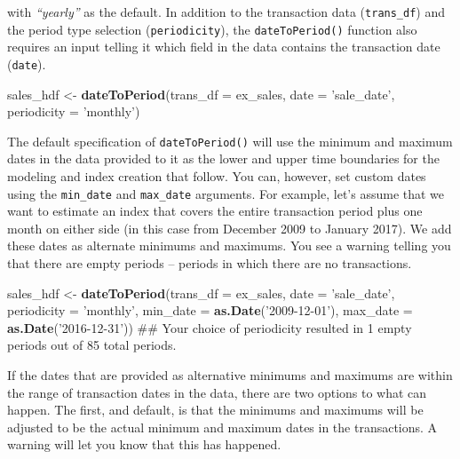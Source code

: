 \documentclass[]{article}
\newenvironment{Shaded}{\begin{snugshade}}{\end{snugshade}}
\newcommand{\DataTypeTok}[1]{\textcolor[rgb]{0.13,0.29,0.53}{#1}}
\newcommand{\KeywordTok}[1]{\textcolor[rgb]{0.13,0.29,0.53}{\textbf{#1}}}
\newcommand{\NormalTok}[1]{#1}
\newcommand{\StringTok}[1]{\textcolor[rgb]{0.31,0.60,0.02}{#1}}
\begin{document}
with \emph{``yearly''} as the default. In addition to the transaction
data (\texttt{trans\_df}) and the period type selection
(\texttt{periodicity}), the \texttt{dateToPeriod()} function also
requires an input telling it which field in the data contains the
transaction date (\texttt{date}).

\begin{Shaded}
\begin{Highlighting}[]
\NormalTok{  sales_hdf <-}\StringTok{ }\KeywordTok{dateToPeriod}\NormalTok{(}\DataTypeTok{trans_df =}\NormalTok{ ex_sales,}
                            \DataTypeTok{date =} \StringTok{'sale_date'}\NormalTok{,}
                            \DataTypeTok{periodicity =} \StringTok{'monthly'}\NormalTok{)}
\end{Highlighting}
\end{Shaded}

The default specification of \texttt{dateToPeriod()} will use the
minimum and maximum dates in the data provided to it as the lower and
upper time boundaries for the modeling and index creation that follow.
You can, however, set custom dates using the \texttt{min\_date} and
\texttt{max\_date} arguments. For example, let's assume that we want to
estimate an index that covers the entire transaction period plus one
month on either side (in this case from December 2009 to January 2017).
We add these dates as alternate minimums and maximums. You see a warning
telling you that there are empty periods -- periods in which there are
no transactions.

\begin{Shaded}
\begin{Highlighting}[]
\NormalTok{  sales_hdf <-}\StringTok{ }\KeywordTok{dateToPeriod}\NormalTok{(}\DataTypeTok{trans_df =}\NormalTok{ ex_sales,}
                            \DataTypeTok{date =} \StringTok{'sale_date'}\NormalTok{,}
                            \DataTypeTok{periodicity =} \StringTok{'monthly'}\NormalTok{,}
                            \DataTypeTok{min_date =} \KeywordTok{as.Date}\NormalTok{(}\StringTok{'2009-12-01'}\NormalTok{),}
                            \DataTypeTok{max_date =} \KeywordTok{as.Date}\NormalTok{(}\StringTok{'2016-12-31'}\NormalTok{))}
\NormalTok{## Your choice of periodicity resulted in 1 empty periods out of 85 total periods.}
\end{Highlighting}
\end{Shaded}

If the dates that are provided as alternative minimums and maximums are
within the range of transaction dates in the data, there are two options
to what can happen. The first, and default, is that the minimums and
maximums will be adjusted to be the actual minimum and maximum dates in
the transactions. A warning will let you know that this has happened.
\end{document}
